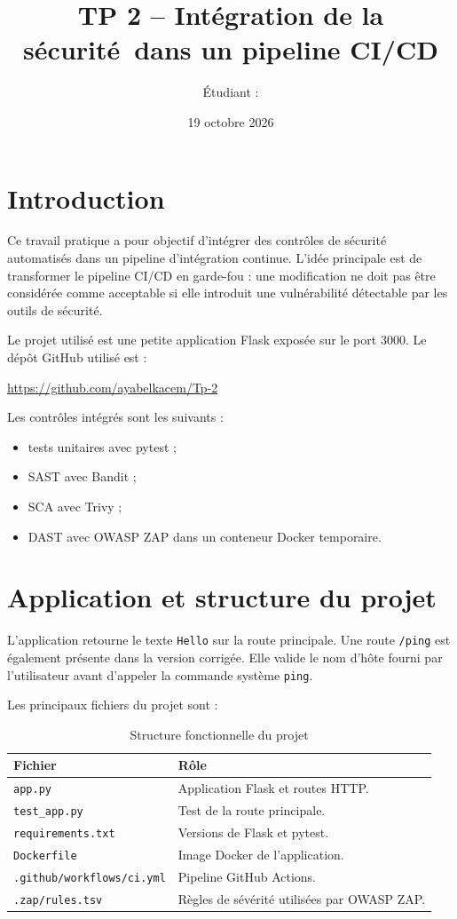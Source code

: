\documentclass[12pt,a4paper]{article}
\title{\textbf{TP 2 -- Intégration de la sécurité\ dans un pipeline CI/CD}}
\author{Étudiant : \rule{7cm}{0.4pt}}
\date{19 octobre 2026}
\begin{document}
\maketitle
\tableofcontents
\newpage

\section{Introduction}

Ce travail pratique a pour objectif d'intégrer des contrôles de sécurité automatisés
dans un pipeline d'intégration continue. L'idée principale est de transformer le
pipeline CI/CD en garde-fou : une modification ne doit pas être considérée comme
acceptable si elle introduit une vulnérabilité détectable par les outils de sécurité.

Le projet utilisé est une petite application Flask exposée sur le port 3000. Le dépôt
GitHub utilisé est :
\begin{center}
\url{https://github.com/ayabelkacem/Tp-2}
\end{center}

Les contrôles intégrés sont les suivants :
\begin{itemize}
  \item tests unitaires avec pytest ;
  \item SAST avec Bandit ;
  \item SCA avec Trivy ;
  \item DAST avec OWASP ZAP dans un conteneur Docker temporaire.
\end{itemize}

\section{Application et structure du projet}

L'application retourne le texte \texttt{Hello} sur la route principale. Une route
\texttt{/ping} est également présente dans la version corrigée. Elle valide le nom
d'hôte fourni par l'utilisateur avant d'appeler la commande système \texttt{ping}.

Les principaux fichiers du projet sont :
\begin{table}[H]
\centering
\begin{tabular}{p{4cm}p{9cm}}
\toprule
\textbf{Fichier} & \textbf{Rôle} \\
\midrule
\texttt{app.py} & Application Flask et routes HTTP. \\
\texttt{test\_app.py} & Test de la route principale. \\
\texttt{requirements.txt} & Versions de Flask et pytest. \\
\texttt{Dockerfile} & Image Docker de l'application. \\
\texttt{.github/workflows/ci.yml} & Pipeline GitHub Actions. \\
\texttt{.zap/rules.tsv} & Règles de sévérité utilisées par OWASP ZAP. \\
\bottomrule
\end{tabular}
\caption{Structure fonctionnelle du projet}
\end{table}
\end{document}
